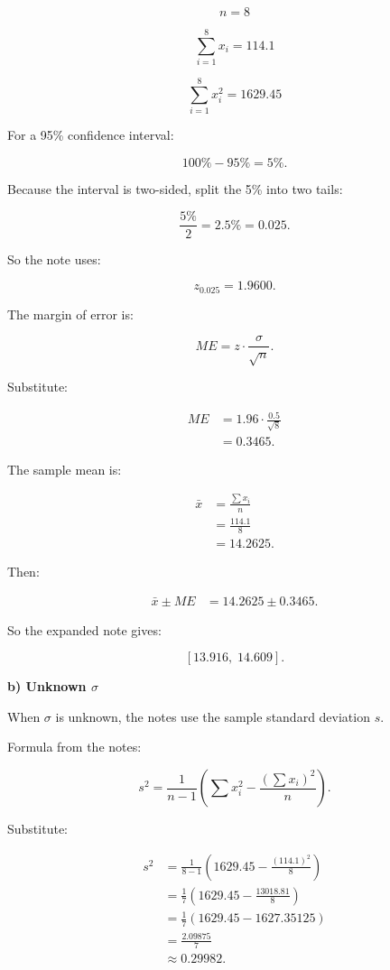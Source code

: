 \documentclass[10pt]{article}
\begin{document}
\[
n=8
\]

\[
\sum_{i=1}^{8}x_i=114.1
\]

\[
\sum_{i=1}^{8}x_i^2=1629.45
\]

For a 95\% confidence interval:

\[
100\%-95\%=5\%.
\]

Because the interval is two-sided,
split the 5\% into two tails:

\[
\frac{5\%}{2}=2.5\%=0.025.
\]

So the note uses:

\[
z_{0.025}=1.9600.
\]

The margin of error is:

\[
ME=
z\cdot \frac{\sigma}{\sqrt{n}}.
\]

Substitute:

\begin{align*}
ME
&=
1.96\cdot
\frac{0.5}{\sqrt{8}} \\[2mm]
&=0.3465.
\end{align*}

The sample mean is:

\begin{align*}
\bar{x}
&=
\frac{\sum x_i}{n} \\[2mm]
&=
\frac{114.1}{8} \\[2mm]
&=14.2625.
\end{align*}

Then:

\begin{align*}
\bar{x}\pm ME
&=14.2625\pm 0.3465.
\end{align*}

So the expanded note gives:

\[
[13.916,\;14.609].
\]

\textbf{b) Unknown \(\sigma\)}

When \(\sigma\) is unknown, the notes use the
sample standard deviation \(s\).

Formula from the notes:

\[
s^2=
\frac{1}{n-1}
\left(
\sum x_i^2
-
\frac{(\sum x_i)^2}{n}
\right).
\]

Substitute:

\begin{align*}
s^2
&=
\frac{1}{8-1}
\left(
1629.45
-
\frac{(114.1)^2}{8}
\right) \\[2mm]
&=
\frac{1}{7}
\left(
1629.45
-
\frac{13018.81}{8}
\right) \\[2mm]
&=
\frac{1}{7}
\left(
1629.45-1627.35125
\right) \\[2mm]
&=
\frac{2.09875}{7} \\[2mm]
&\approx 0.29982.
\end{align*}
\end{document}
